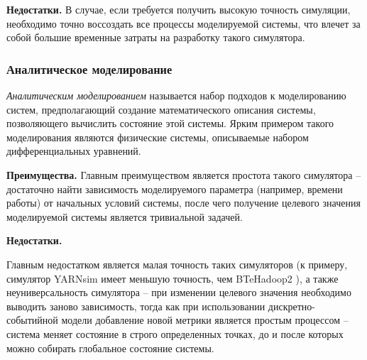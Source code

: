 \documentclass[../diploma.tex]{subfile}
\begin{document}
    {\bf Недостатки.}
    В случае, если требуется получить высокую точность симуляции, необходимо
    точно воссоздать все процессы моделируемой системы, что влечет за собой
    большие временные затраты на разработку такого симулятора.


    \subsubsection{Аналитическое моделирование}
    \label{sec:simulation_methods:subsec:analytical_modeling}

    \textit{Аналитическим моделированием} называется набор подходов к
    моделированию систем, предполагающий создание математического описания
    системы, позволяющего вычислить состояние этой системы. Ярким примером
    такого моделирования являются физические системы, описываемые набором
    дифференциальных уравнений. 

    {\bf Преимущества.}
    Главным преимуществом является простота такого симулятора -- достаточно
    найти зависимость моделируемого параметра (например, времени работы) от
    начальных условий системы, после чего получение целевого значения
    моделируемой системы является тривиальной задачей.

    {\bf Недостатки.}

    Главным недостатком является малая точность таких симуляторов (к примеру,
    симулятор YARNsim \cite{yarnsim} имеет меньшую точность, чем BTeHadoop2
    \cite{baseline_model}), а также неуниверсальность симулятора -- при
    изменении целевого значения необходимо выводить заново зависимость, тогда
    как при использовании дискретно-событийной модели добавление новой метрики
    является простым процессом -- система меняет состояние в строго определенных
    точках, до и после которых можно собирать глобальное состояние системы.
\end{document}
